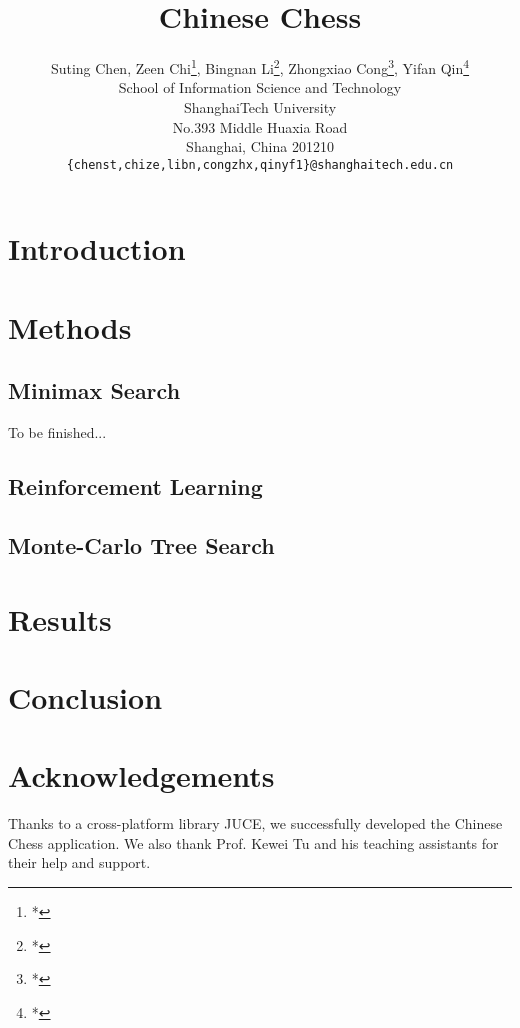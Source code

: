 \documentclass[letterpaper]{article}
\title{Chinese Chess}
\author{Suting Chen, Zeen Chi\footnote[2]{*}, Bingnan Li\footnote[2]{*}, Zhongxiao Cong\footnote[2]{*}, Yifan Qin\footnote[2]{*}\\
School of Information Science and Technology\\
ShanghaiTech University\\
No.393 Middle Huaxia Road\\
Shanghai, China 201210\\
\texttt{\{chenst,chize,libn,congzhx,qinyf1\}@shanghaitech.edu.cn}
}
\begin{document}
\maketitle

\begin{abstract}
\begin{quote}

\end{quote}
\end{abstract}

\section{Introduction}\label{sec:introduction}


\section{Methods}\label{sec:methods}

\subsection{Minimax Search}\label{subsec:minimax-search}
To be finished...
\subsection{Reinforcement Learning}\label{subsec:reinforcement-learning}

\subsection{Monte-Carlo Tree Search}
\label{subsec:monte-carlo-tree-search}



\section{Results}\label{sec:results}


\section{Conclusion}\label{sec:conclusion}


\section{Acknowledgements}\label{sec:acknowledgements}

Thanks to a cross-platform library JUCE, we successfully developed the Chinese Chess application.
We also thank Prof. Kewei Tu and his teaching assistants for their help and support.



\end{document}
